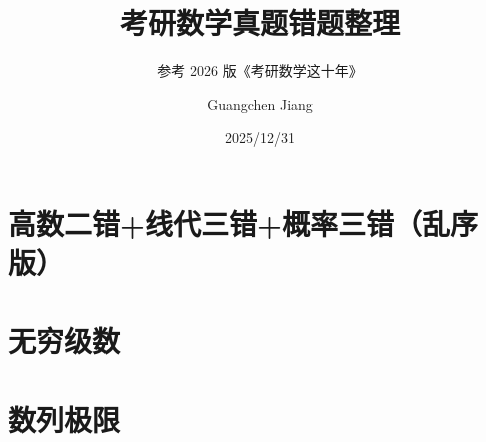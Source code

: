 \documentclass[lang=cn,math=mtpro2,11pt,scheme=chinese]{elegantbook}
\title{考研数学真题错题整理}
\subtitle{参考 2026 版《考研数学这十年》}
\author{Guangchen Jiang}
\date{2025/12/31}
\begin{document}


\mainmatter

\chapter*{高数二错+线代三错+概率三错（乱序版）}



\chapter{无穷级数}



\chapter{数列极限}




\end{document}
